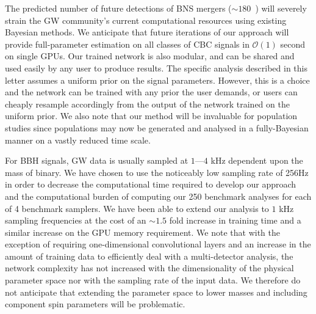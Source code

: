 \documentclass[%
showpacs,
nofootinbib,
 amsmath,amssymb,
 aps,
 twocolumn,
 prl,
 reprint,
floatfix,
]{revtex4-1}
\begin{document}
%
%
The predicted number of future detections of \ac{BNS} mergers ($\sim
180$~\cite{2018LRR....21....3A}) will severely strain the \ac{GW} community's
current computational resources using existing Bayesian methods. We anticipate
that future iterations of our approach will provide full-parameter estimation
on all classes of \ac{CBC} signals in $\mathcal{O}(1)$ second on single
\acp{GPU}. Our trained network is also modular, and can be shared and used
easily by any user to produce results. The specific analysis described in this
letter assumes a uniform prior on the signal parameters. However, this is a
choice and the network can be trained with any prior the user demands, or users
can cheaply resample accordingly from the output of the network trained on the
uniform prior. We also note that our method will be invaluable for population
studies since populations may now be generated and analysed in a fully-Bayesian
manner on a vastly reduced time scale. 

%
%
For \ac{BBH} signals, \ac{GW} data is usually sampled at $1$---$4$ kHz
dependent upon the mass of binary. We have chosen to use the noticeably low
sampling rate of 256Hz in order to decrease the computational time
required to develop our approach and the computational burden of computing our
250 benchmark analyses for each of 4 benchmark samplers. We have been able to
extend our analysis to $1$ kHz sampling frequencies at the cost of an $\sim1.5$
fold increase in training time and a similar increase on the \ac{GPU} memory
requirement. We note that with the exception of requiring one-dimensional
convolutional layers and an increase in the amount of training data to
efficiently deal with a multi-detector analysis, the network complexity has not
increased with the dimensionality of the physical parameter space nor with the
sampling rate of the input data. We therefore do not anticipate that extending
the parameter space to lower masses and including component spin parameters
will be problematic. 
\end{document}
